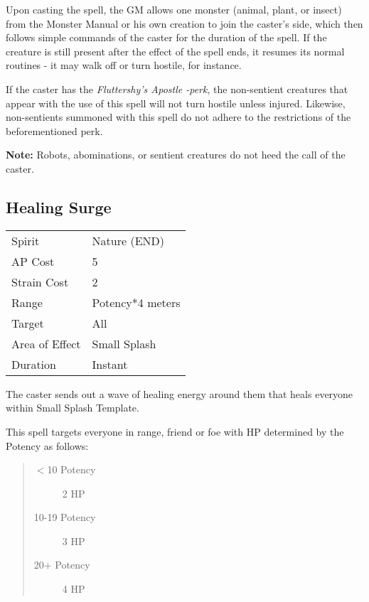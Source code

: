 \documentclass[11pt,a4paper,twocolumn]{book}
\begin{document}
Upon casting the spell, the GM allows one monster (animal, plant, or insect) from the Monster Manual or his own creation to join the caster's side, which then follows simple commands of the caster for the duration of the spell. If the creature is still present after the effect of the spell ends, it resumes its normal routines - it may walk off or turn hostile, for instance.  

If the caster has the \textit{Fluttershy's Apostle -perk}, the non-sentient creatures that appear with the use of this spell will not turn hostile unless injured. Likewise, non-sentients summoned with this spell do not adhere to the restrictions of the beforementioned perk.

\textbf{Note:} Robots, abominations, or sentient creatures do not heed the call of the caster.

\subsection*{Healing Surge}
{
	\begin{tabu} to 70mm{| X[l,4] | X[l,7] |}
		\hline
		Spirit         & Nature (END)          \\
		AP Cost        & 5                     \\
		Strain Cost    & 2                     \\
		Range          & Potency*4 meters \\
		Target         & All                   \\
		Area of Effect & Small Splash          \\
		Duration       & Instant               \\ \hline
	\end{tabu}
	
}
\smallskip

The caster sends out a wave of healing energy around them that heals everyone within Small Splash Template. 

This spell targets everyone in range, friend or foe with HP determined by the Potency as follows:
\begin{quote}
	\begin{description}
		\item[$<$10 Potency] 	2 HP
		\item[10-19 Potency] 	3 HP
		\item[20+ Potency]  	4 HP
	\end{description}	
\end{quote}
\end{document}
